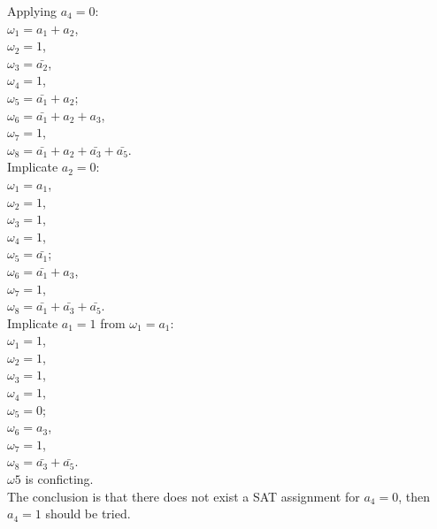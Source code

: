 \documentclass[12pt]{article}
\begin{document}
    \noindent
    Applying $a_{4} = 0$:\\
    $\omega_{1} = a_{1} + a_{2}$,\\
    $\omega_{2} = 1$,\\
    $\omega_{3} = \bar{a_{2}}$,\\
    $\omega_{4} = 1$,\\
    $\omega_{5} = \bar{a_{1}} + a_{2}$;\\
    $\omega_{6} = \bar{a_{1}} + a_{2} + a_{3}$,\\
    $\omega_{7} = 1$,\\
    $\omega_{8} = \bar{a_{1}} + a_{2} + \bar{a_{3}} + \bar{a_5}$.\\
    Implicate $a_{2} = 0$:\\
    $\omega_{1} = a_{1}$,\\
    $\omega_{2} = 1$,\\
    $\omega_{3} = 1$,\\
    $\omega_{4} = 1$,\\
    $\omega_{5} = \bar{a_{1}}$;\\
    $\omega_{6} = \bar{a_{1}} + a_{3}$,\\
    $\omega_{7} = 1$,\\
    $\omega_{8} = \bar{a_{1}} + \bar{a_{3}} + \bar{a_5}$.\\
    Implicate $a_{1} = 1$ from $\omega_{1} = a_{1}$:\\
    $\omega_{1} = 1$,\\
    $\omega_{2} = 1$,\\
    $\omega_{3} = 1$,\\
    $\omega_{4} = 1$,\\
    $\omega_{5} = 0$;\\
    $\omega_{6} = a_{3}$,\\
    $\omega_{7} = 1$,\\
    $\omega_{8} = \bar{a_{3}} + \bar{a_5}$.\\
    $\omega{5}$ is conficting.\\
    The conclusion is that there does not exist a SAT assignment for $a_{4} = 0$,
    then $a_{4} = 1$ should be tried.
\end{document}
